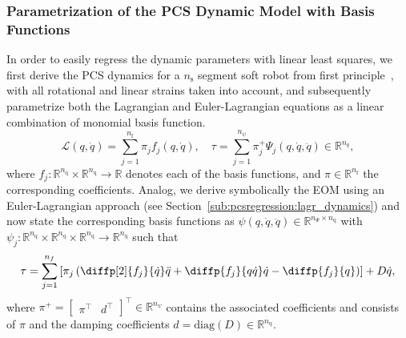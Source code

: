 \subsubsection{Parametrization of the PCS Dynamic Model with Basis Functions}
In order to easily regress the dynamic parameters with linear least squares, we first derive the \gls{PCS} dynamics for a $n_\mathrm{s}$ segment soft robot from first principle~\citep{armanini2023soft, della2023model}, with all rotational and linear strains taken into account, and subsequently parametrize both the Lagrangian and Euler-Lagrangian equations as a linear combination of monomial basis function.
\begin{equation}\label{eq:pcsregression:lagrangian_basis_functions}
    \mathcal{L}(q, \dot{q}) = \sum_{j=1}^{n_\mathrm{f}} \pi_j f_j(q, \dot{q}), 
    \quad
    \tau = \sum_{j=1}^{n_\psi} \pi_j^{+}\Psi_j(q,\dot{q},\ddot{q}) \in \mathbb{R}^{n_q},
\end{equation}
where $f_j: \mathbb{R}^{n_\mathrm{q}} \times \mathbb{R}^{n_\mathrm{q}} \to \mathbb{R}$ denotes each of the basis functions, and $\pi \in \mathbb{R}^{n_\mathrm{f}}$ the corresponding coefficients.
Analog, we derive symbolically the \gls{EOM} using an Euler-Lagrangian approach (see Section~\ref{sub:pcsregression:lagr_dynamics}) and now state the corresponding basis functions as $\psi(q, \dot{q}, \ddot{q}) \in \mathbb{R}^{n_\Psi \times n_\mathrm{q}}$ with $\psi_j: \mathbb{R}^{n_\mathrm{q}} \times \mathbb{R}^{n_\mathrm{q}} \times \mathbb{R}^{n_\mathrm{q}} \to \mathbb{R}^{n_\mathrm{q}}$ such that
\begin{equation}
    \tau = \sum_{j=1}^{n_{f}} \left[ \pi_j \left( \diffp[2]{f_j}{{\dot{q}}}\ddot{q} + \diffp{f_j}{{q}{\dot{q}}}\dot{q} - \diffp{f_j}{{q}} \right) \right] + D\dot{q},
\end{equation}
where
$\pi^+ = \begin{bmatrix}
    \pi^\top & d^\top 
\end{bmatrix}^\top \in \mathbb{R}^{n_{\psi}}$ contains the associated coefficients and consists of $\pi$ and the damping coefficients $d = \mathrm{diag}(D) \in \mathbb{R}^{n_\mathrm{q}}$.

